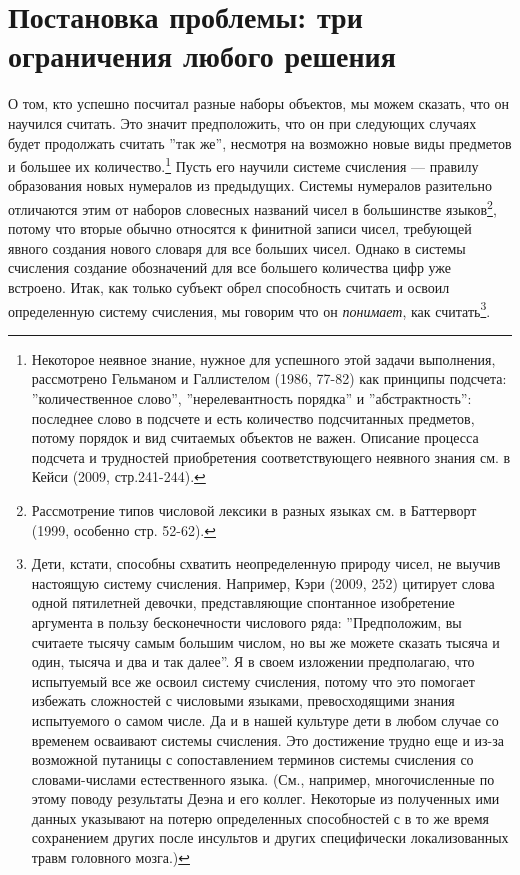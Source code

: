 \documentclass[11pt]{book}
\begin{document}
\qquad

\section{Постановка проблемы: три ограничения любого решения}

О том, кто успешно посчитал разные наборы объектов, мы можем сказать, что он научился считать. Это значит предположить, что он при следующих случаях будет продолжать считать ''так же'', несмотря на возможно новые виды предметов и большее их количество.\footnote{Некоторое неявное знание, нужное для успешного этой задачи выполнения, рассмотрено Гельманом и Галлистелом (1986, 77-82) как принципы подсчета: ''количественное слово'', ''нерелевантность порядка'' и ''абстрактность'': последнее слово в подсчете и есть количество подсчитанных предметов, потому порядок и вид считаемых объектов не важен. Описание процесса подсчета и трудностей приобретения соответствующего неявного знания см. в Кейси (2009, стр.241-244).} Пусть его научили системе счисления --- правилу образования новых нумералов из предыдущих. Системы нумералов разительно отличаются этим от наборов словесных названий чисел в большинстве языков\footnote{Рассмотрение типов числовой лексики в разных языках см. в Баттерворт (1999, особенно стр. 52-62).}, потому что вторые обычно относятся к финитной записи чисел, требующей явного создания нового словаря для все больших чисел. Однако в системы счисления создание обозначений для все большего количества цифр уже встроено. Итак, как только субъект обрел способность считать и освоил определенную систему счисления, мы говорим что он \textit{понимает}, как считать\footnote{Дети, кстати, способны схватить неопределенную природу чисел, не выучив настоящую систему счисления. Например, Кэри (2009, 252) цитирует слова одной пятилетней девочки, представляющие спонтанное изобретение аргумента в пользу бесконечности числового ряда: ''Предположим, вы считаете тысячу самым большим числом, но вы же можете сказать тысяча и один, тысяча и два и так далее''. Я в своем изложении предполагаю, что испытуемый все же освоил систему счисления, потому что это помогает избежать сложностей с числовыми языками, превосходящими знания испытуемого о самом числе. Да и в нашей культуре дети в любом случае со временем осваивают системы счисления. Это достижение трудно еще и из-за возможной путаницы с сопоставлением терминов системы счисления со словами-числами естественного языка. (См., например, многочисленные по этому поводу результаты Деэна и его коллег. Некоторые из полученных ими данных указывают на потерю определенных способностей с в то же время сохранением других после инсультов и других специфически локализованных травм головного мозга.)}.
\end{document}
